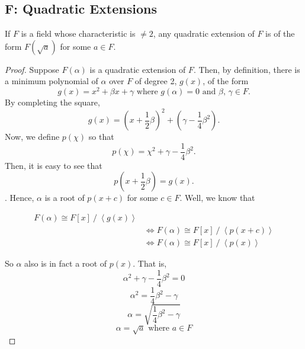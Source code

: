 \documentclass[12pt]{article}
\begin{document}
\subsection{F: Quadratic Extensions}
If $F$ is a field whose characteristic is $\neq 2$, any quadratic extension of $F$ is of the form
$F(\sqrt{a})$ for some $a \in F$.

\begin{proof}
Suppose $F(\alpha)$ is a quadratic extension of $F$. Then, by definition, there is a minimum
polynomial of $\alpha$ over $F$ of degree 2, $g(x)$, of the form
$$g(x) = x^2 + \beta x + \gamma \text{ where } g(\alpha)=0 \text{ and } \beta \text{, } \gamma \in F \text{.}$$
By completing the square,
$$g(x) = \left(x + \frac{1}{2}\beta \right) ^2 + \left(\gamma - \frac{1}{4}\beta^2\right)\text{.}$$
Now, we define $p(\chi)$ so that
$$p(\chi) = \chi^2 + \gamma - \frac{1}{4}\beta^2\text{.}$$
Then, it is easy to see that
$$p(x + \frac{1}{2}\beta) = g(x)\text{.}$$.
Hence, $\alpha$ is a root of $p(x + c)$ for some $c \in F$.
Well, we know that 

    \begin{align*}
        F(\alpha) \cong F[x]\mathbin{/}\left<g(x)\right> \\ &\Leftrightarrow
        F(\alpha) \cong F[x]\mathbin{/}\left<p(x+c)\right> \\ &\Leftrightarrow
        F(\alpha) \cong F[x]\mathbin{/}\left<p(x)\right>
    \end{align*}

So $\alpha$ also is in fact a root of $p(x)$. That is,
$$\alpha^2 + \gamma - \frac{1}{4}\beta^2 = 0$$
$$\alpha^2 = \frac{1}{4}\beta^2 - \gamma$$
$$\alpha = \sqrt{\frac{1}{4}\beta^2 - \gamma}$$
$$\alpha = \sqrt{a} \text{ where } a \in F$$

\end{proof}
\end{document}
